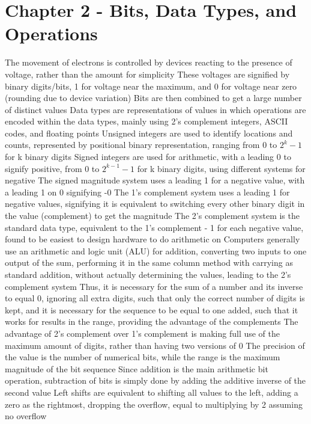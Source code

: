 \documentclass[11 pt, twoside]{article}
\newenvironment{outline*}
{
	\begin{outline}[enumerate]
	}
	{\end{outline}
}
\begin{document}
\section{Chapter 2 - Bits, Data Types, and Operations}
\begin{outline*}
\1 The movement of electrons is controlled by devices reacting to the presence of voltage, rather than the amount for simplicity
\2 These voltages are signified by binary digits/bits, 1 for voltage near the maximum, and 0 for voltage near zero (rounding due to device variation)
\2 Bits are then combined to get a large number of distinct values
\1 Data types are representations of values in which operations are encoded within the data types, mainly using 2's complement integers, ASCII codes, and floating points
\2 Unsigned integers are used to identify locations and counts, represented by positional binary representation, ranging from 0 to $2^k - 1$ for k binary digits
\2 Signed integers are used for arithmetic, with a leading 0 to signify positive, from 0 to $2^{k-1} - 1$ for k binary digits, using different systems for negative
\3 The signed magnitude system uses a leading 1 for a negative value, with a leading 1 on 0 signifying -0
\3 The 1's complement system uses a leading 1 for negative values, signifying it is equivalent to switching every other binary digit in the value (complement) to get the magnitude
\3 The 2's complement system is the standard data type, equivalent to the 1's complement - 1 for each negative value, found to be easiest to design hardware to do arithmetic on
\1 Computers generally use an arithmetic and logic unit (ALU) for addition, converting two inputs to one output of the sum, performing it in the same column method with carrying as standard addition, without actually determining the values, leading to the 2's complement system
\2 Thus, it is necessary for the sum of a number and its inverse to equal 0, ignoring all extra digits, such that only the correct number of digits is kept, and it is necessary for the sequence to be equal to one added, such that it works for results in the range, providing the advantage of the complements
\2 The advantage of 2's complement over 1's complement is making full use of the maximum amount of digits, rather than having two versions of 0
\2 The precision of the value is the number of numerical bits, while the range is the maximum magnitude of the bit sequence
\1 Since addition is the main arithmetic bit operation, subtraction of bits is simply done by adding the additive inverse of the second value
\2 Left shifts are equivalent to shifting all values to the left, adding a zero as the rightmost, dropping the overflow, equal to multiplying by 2 assuming no overflow

\end{outline*}
\end{document}
